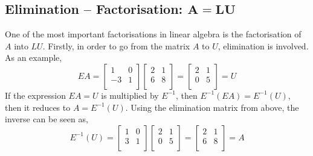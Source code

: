         \subsection{Elimination – Factorisation: \(\boldsymbol{A=LU}\)}
            One of the most important factorisations in linear algebra is the factorisation of \(A\) into \(LU\). 
            Firstly, in order to go from the matrix \(A\) to \(U\), elimination is involved. As an example,
            \begin{equation}
                EA =
                \begin{bmatrix}
                    1 & 0 \\
                    -3 & 1 \\
                \end{bmatrix}
                \begin{bmatrix}
                    2 & 1 \\
                    6 & 8 \\
                \end{bmatrix}
                =
                \begin{bmatrix}
                    2 & 1 \\
                    0 & 5 \\
                \end{bmatrix}
                = U
            \end{equation}
            If the expression \(EA=U\) is multiplied by \(E^{-1}\), then \(E^{-1}(EA)=E^{-1}(U)\), then it reduces 
            to \(A=E^{-1}(U)\). Using the elimination matrix from above, the inverse can be seen as,
            \begin{equation}
                E^{-1}(U) =
                \begin{bmatrix}
                    1 & 0 \\
                    3 & 1 \\
                \end{bmatrix}
                \begin{bmatrix}
                    2 & 1 \\
                    0 & 5 \\
                \end{bmatrix}
                =
                \begin{bmatrix}
                    2 & 1 \\
                    6 & 8 \\
                \end{bmatrix}
                = A
            \end{equation}
